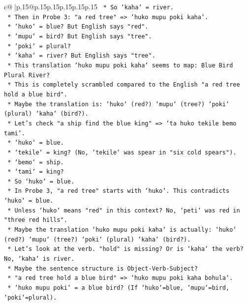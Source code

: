 \documentclass{article}
\begin{document}
{\begin{supertabular}{c@{$\;$}|p{.15\linewidth}@{}p{.15\linewidth}p{.15\linewidth}p{.15\linewidth}p{.15\linewidth}p{.15\linewidth}}
{{{\texttt{        *   So `kaha` = river.} \\
\texttt{        *   Then in Probe 3: "a red tree" => `huko mupu poki kaha`.} \\
\texttt{            *   `huko` = blue? But English says "red".} \\
\texttt{            *   `mupu` = bird? But English says "tree".} \\
\texttt{            *   `poki` = plural?} \\
\texttt{            *   `kaha` = river? But English says "tree".} \\
\texttt{            *   This translation `huko mupu poki kaha` seems to map: Blue Bird Plural River?} \\
\texttt{            *   This is completely scrambled compared to the English "a red tree hold a blue bird".} \\
\texttt{            *   Maybe the translation is: `huko` (red?) `mupu` (tree?) `poki` (plural) `kaha` (bird?).} \\
\texttt{            *   Let's check "a ship find the blue king" => `ta huko tekile bemo tami`.} \\
\texttt{                *   `huko` = blue.} \\
\texttt{                *   `tekile` = king? (No, `tekile` was spear in "six cold spears").} \\
\texttt{                *   `bemo` = ship.} \\
\texttt{                *   `tami` = king?} \\
\texttt{            *   So `huko` = blue.} \\
\texttt{            *   In Probe 3, "a red tree" starts with `huko`. This contradicts `huko` = blue.} \\
\texttt{            *   Unless `huko` means "red" in this context? No, `peti` was red in "three red hills".} \\
\texttt{            *   Maybe the translation `huko mupu poki kaha` is actually: `huko` (red?) `mupu` (tree?) `poki` (plural) `kaha` (bird?).} \\
\texttt{            *   Let's look at the verb. "hold" is missing? Or is `kaha` the verb? No, `kaha` is river.} \\
\texttt{            *   Maybe the sentence structure is Object{-}Verb{-}Subject?} \\
\texttt{            *   "a red tree hold a blue bird" => `huko mupu poki kaha bohula`.} \\
\texttt{                *   `huko mupu poki` = a blue bird? (If `huko`=blue, `mupu`=bird, `poki`=plural).} \\
}}}
\end{supertabular}}
\end{document}
